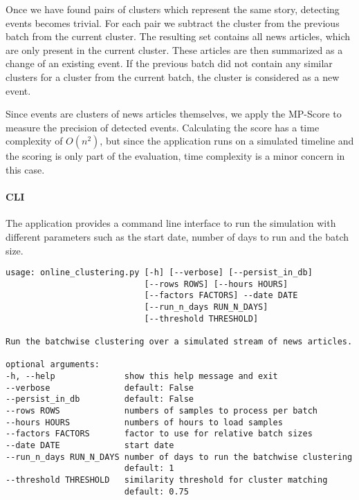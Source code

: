 Once we have found pairs of clusters which represent the same story, detecting events becomes trivial.
For each pair we subtract the cluster from the previous batch from the current cluster.
The resulting set contains all news articles, which are only present in the current cluster.
These articles are then summarized as a change of an existing event. 
If the previous batch did not contain any similar clusters for a cluster from the current batch, 
the cluster is considered as a new event.

Since events are clusters of news articles themselves,
we apply the MP-Score to measure the precision of detected events. 
Calculating the score has a time complexity of $O(n^2)$, but since the application runs on a simulated timeline and the scoring is only part of the evaluation,
time complexity is a minor concern in this case.

\paragraph{CLI}
The application provides a command line interface to run the simulation with different parameters
such as the start date, number of days to run and the batch size.

\begin{lstlisting}[caption=Command line interface for the online clustering., label={lst:cli_online_clustering}]
usage: online_clustering.py [-h] [--verbose] [--persist_in_db] 
                            [--rows ROWS] [--hours HOURS] 
                            [--factors FACTORS] --date DATE
                            [--run_n_days RUN_N_DAYS] 
                            [--threshold THRESHOLD]

Run the batchwise clustering over a simulated stream of news articles.

optional arguments:
-h, --help              show this help message and exit
--verbose               default: False
--persist_in_db         default: False
--rows ROWS             numbers of samples to process per batch
--hours HOURS           numbers of hours to load samples
--factors FACTORS       factor to use for relative batch sizes
--date DATE             start date
--run_n_days RUN_N_DAYS number of days to run the batchwise clustering
                        default: 1
--threshold THRESHOLD   similarity threshold for cluster matching
                        default: 0.75

\end{lstlisting}
